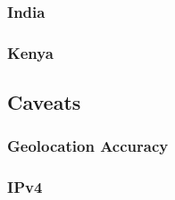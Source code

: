 \subsubsection{India}

\subsubsection{Kenya}

\subsection{Caveats}

\subsubsection{Geolocation Accuracy}

\subsubsection{IPv4}

